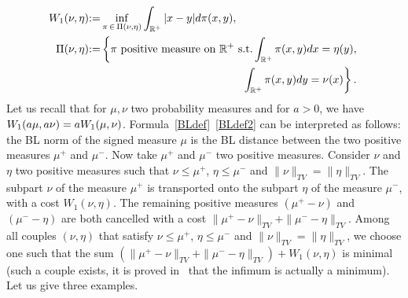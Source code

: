 \documentclass[10pt]{amsart}
\theoremstyle{definition}\newtheorem{defi}[theo]{Definition}\newtheorem{rema}[theo]{Remark}\newtheorem{exam}[theo]{Example}\newtheorem{exem}[theo]{Example}\newtheorem{nota}[theo]{Notation}
\newcommand*\R{\mathbb{R}}
\begin{document}
\begin{equation}\label{defWasserstein}
\begin{split}
W_1(\nu,\eta) &{:=}\inf\limits_{\pi\,\in\,\Pi(\nu,\eta)} \int_{\R^+} \vert x-y\vert d\pi(x,y),\\
\Pi(\nu,\eta) &{:=}\left\{
\pi\text{ positive measure on }\R^+\text{ s.t.} \int_{\R^+}\pi(x,y)dx=\eta(y),\right.\\
&\mkern250mu \left.\int_{\R^+}\pi(x,y)dy=\nu(x)\right\}.
\end{split}
\end{equation}
Let us recall that for $\mu,\nu$ two probability measures and for $a>0$, we have $W_1(a\mu, a\nu)\linebreak = a W_1(\mu,\nu)$. Formula~\eqref{BLdef}~\eqref{BLdef2} can be interpreted as follows: the BL norm of the signed measure $\mu$ is the BL distance between the two positive measures $\mu^+$ and $\mu^-$. Now take $\mu^+$ and $\mu^-$ two positive measures. Consider $\nu$ and $\eta$ two positive measures such that $\nu \leq \mu^+$, $\eta\leq \mu^-$ and $\|\nu\|_{TV}=\|\eta\|_{TV}$. The subpart $\nu$ of the measure $\mu^+$ is transported onto the subpart $\eta$ of the measure $\mu^-$, with a cost $W_1(\nu,\eta)$. The remaining positive measures $(\mu^+ -\nu)$ and $(\mu^- -\eta)$ are both cancelled with a cost $\|\mu^+ -\nu\|_{TV}+\|\mu^- -\eta\|_{TV} $. Among all couples $(\nu,\eta)$ that satisfy $\nu \leq \mu^+$, $\eta\leq \mu^-$ and $\|\nu\|_{TV}=\|\eta\|_{TV}$, we choose one such that the sum $(\|\mu^+ - \nu\|_{TV} +\|\mu^-- \eta\|_{TV})+ W_1(\nu,\eta)$ is minimal (such a couple exists, it is proved in~\cite{PR14} that the infimum is actually a minimum). Let us give three examples.
\end{document}
